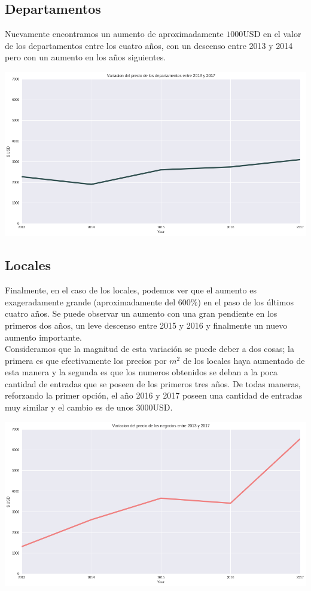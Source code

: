 \documentclass[a4paper, 10pt]{article}
\newcommand\tab[1][0.5cm]{\hspace*{#1}}
\begin{document}
			\subsection{Departamentos}
				Nuevamente encontramos un aumento de aproximadamente $1000$USD en el valor de los departamentos entre los cuatro
				años, con un descenso entre 2013 y 2014 pero con un aumento en los años siguientes.
				\begin{center}
   		    			\includegraphics[width=\textwidth]{images/apartmentsVariation}
				\end{center}
			\subsection{Locales}
				Finalmente, en el caso de los locales, podemos ver que el aumento es exageradamente grande (aproximadamente del
				$600\%$) en el paso de los últimos cuatro años. Se puede observar un aumento con una gran pendiente en los primeros
				dos años, un leve descenso entre 2015 y 2016 y finalmente un nuevo aumento importante. \\
				\tab Consideramos que la magnitud de esta variación se puede deber a dos cosas; la primera es que efectivamente los
				precios por $m^2$ de los locales haya aumentado de esta manera y la segunda es que los numeros obtenidos se deban
				a la poca cantidad de entradas que se poseen de los primeros tres años. De todas maneras, reforzando la primer 
				opción, el año 2016 y 2017 poseen una cantidad de entradas muy similar y el cambio es de unos $3000$USD.
				\begin{center}
   		    			\includegraphics[width=\textwidth]{images/storeVariation}
				\end{center}
\end{document}
